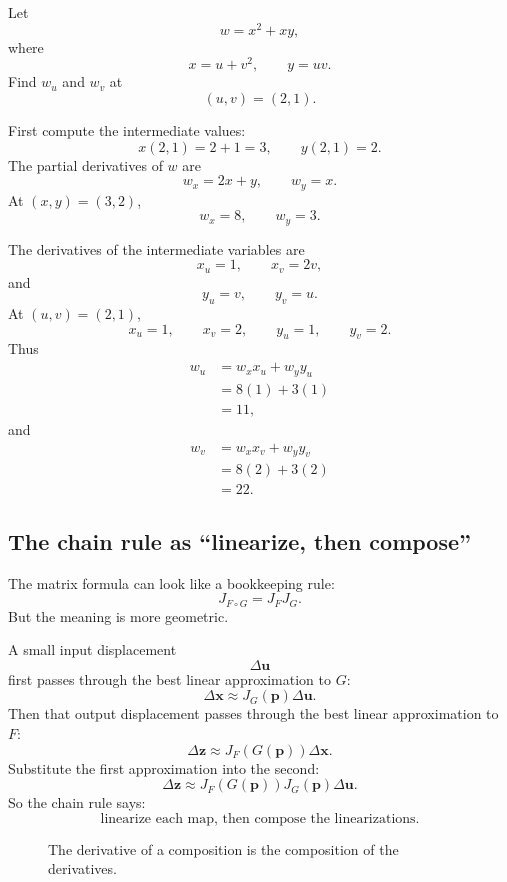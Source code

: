 \begin{example}
Let
\[
    w=x^2+xy,
\]
where
\[
    x=u+v^2,
    \qquad
    y=uv.
\]
Find \(w_u\) and \(w_v\) at
\[
    (u,v)=(2,1).
\]

First compute the intermediate values:
\[
    x(2,1)=2+1=3,
    \qquad
    y(2,1)=2.
\]
The partial derivatives of \(w\) are
\[
    w_x=2x+y,
    \qquad
    w_y=x.
\]
At \((x,y)=(3,2)\),
\[
    w_x=8,
    \qquad
    w_y=3.
\]

The derivatives of the intermediate variables are
\[
    x_u=1,
    \qquad
    x_v=2v,
\]
and
\[
    y_u=v,
    \qquad
    y_v=u.
\]
At \((u,v)=(2,1)\),
\[
    x_u=1,
    \qquad
    x_v=2,
    \qquad
    y_u=1,
    \qquad
    y_v=2.
\]
Thus
\[
\begin{aligned}
    w_u
    &=
    w_xx_u+w_yy_u\\
    &=
    8(1)+3(1)\\
    &=
    11,
\end{aligned}
\]
and
\[
\begin{aligned}
    w_v
    &=
    w_xx_v+w_yy_v\\
    &=
    8(2)+3(2)\\
    &=
    22.
\end{aligned}
\]
\end{example}

\subsection{The chain rule as ``linearize, then compose''}

The matrix formula can look like a bookkeeping rule:
\[
    J_{F\circ G}=J_FJ_G.
\]
But the meaning is more geometric.

A small input displacement
\[
    \Delta\mathbf u
\]
first passes through the best linear approximation to \(G\):
\[
    \Delta\mathbf x\approx J_G(\mathbf p)\Delta\mathbf u.
\]
Then that output displacement passes through the best linear approximation to \(F\):
\[
    \Delta\mathbf z
    \approx
    J_F(G(\mathbf p))\Delta\mathbf x.
\]
Substitute the first approximation into the second:
\[
    \Delta\mathbf z
    \approx
    J_F(G(\mathbf p))J_G(\mathbf p)\Delta\mathbf u.
\]
So the chain rule says:
\[
\boxed{
    \text{linearize each map, then compose the linearizations.}
}
\]

\begin{figure}[h]
\centering
{}
\caption{The derivative of a composition is the composition of the derivatives.}
\end{figure}

